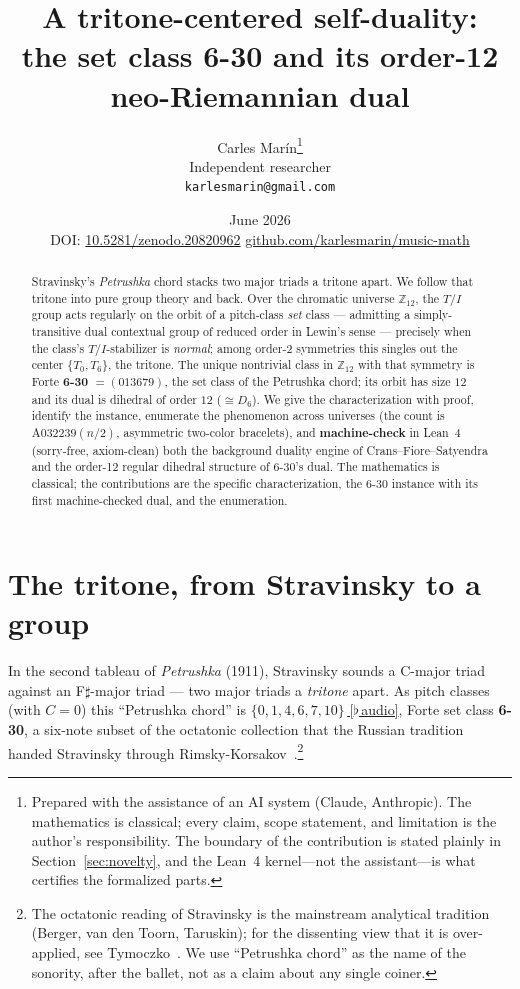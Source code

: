 \documentclass[11pt]{article}
\title{\bf A tritone-centered self-duality:\\
  the set class 6-30 and its order-12 neo-Riemannian dual}
\author{Carles Mar\'in\thanks{Prepared with the assistance of an AI system (Claude, Anthropic).
The mathematics is classical; every claim, scope statement, and limitation is the author's
responsibility. The boundary of the contribution is stated plainly in Section~\ref{sec:novelty}, and
the Lean~4 kernel---not the assistant---is what certifies the formalized parts.}\\[3pt]
  \normalsize Independent researcher\\
  \normalsize \texttt{karlesmarin@gmail.com}}
\date{June 2026\\[3pt]\normalsize DOI: \href{https://doi.org/10.5281/zenodo.20820962}{10.5281/zenodo.20820962}
\quad\textbullet\quad \href{https://github.com/karlesmarin/music-math}{github.com/karlesmarin/music-math}}
\newcommand{\Ztwelve}{\mathbb{Z}_{12}}
\newcommand{\Dgrp}[1]{D_{#1}}
\newcommand{\audiobase}{https://github.com/karlesmarin/music-math/raw/main/media}
\newcommand{\audio}[1]{\href{\audiobase/#1}{\textcolor{ctA}{\footnotesize\,[$\flat$\,audio]}}}
\begin{document}
\maketitle

\begin{abstract}\noindent
Stravinsky's \emph{Petrushka} chord stacks two major triads a tritone apart. We follow that tritone
into pure group theory and back. Over the chromatic universe $\Ztwelve$, the $T/I$ group acts regularly
on the orbit of a pitch-class \emph{set} class --- admitting a simply-transitive dual contextual group
of reduced order in Lewin's sense --- precisely when the class's $T/I$-stabilizer is \emph{normal}; among
order-2 symmetries this singles out the center $\{T_0,T_6\}$, the tritone. The unique nontrivial class
in $\Ztwelve$ with that symmetry is Forte \textbf{6-30} $=(013679)$, the set class of the Petrushka
chord; its orbit has size $12$ and its dual is dihedral of order $12$ ($\cong\Dgrp{6}$). We give the
characterization with proof, identify the instance, enumerate the phenomenon across universes (the count
is $\mathrm{A}032239(n/2)$, asymmetric two-color bracelets), and \textbf{machine-check} in Lean~4
(sorry-free, axiom-clean) both the background duality engine of Crans--Fiore--Satyendra and the order-12
regular dihedral structure of 6-30's dual. The mathematics is classical; the contributions are the
specific characterization, the 6-30 instance with its first machine-checked dual, and the enumeration.
\end{abstract}

\section{The tritone, from Stravinsky to a group}\label{sec:intro}

In the second tableau of \emph{Petrushka} (1911), Stravinsky sounds a C-major triad against an
F$\sharp$-major triad --- two major triads a \emph{tritone} apart. As pitch classes (with $C=0$) this
``Petrushka chord'' is $\{0,1,4,6,7,10\}$\,\audio{petrushka_chord.wav}, Forte set class \textbf{6-30}, a
six-note subset of the octatonic collection that the Russian tradition handed Stravinsky through
Rimsky-Korsakov~\cite{Berger,Taruskin,vandenToorn}.\footnote{The octatonic reading of Stravinsky is the
mainstream analytical tradition (Berger, van den Toorn, Taruskin); for the dissenting view that it is
over-applied, see Tymoczko~\cite{TymoczkoOct}. We use ``Petrushka chord'' as the name of the sonority,
after the ballet, not as a claim about any single coiner.}
\end{document}

